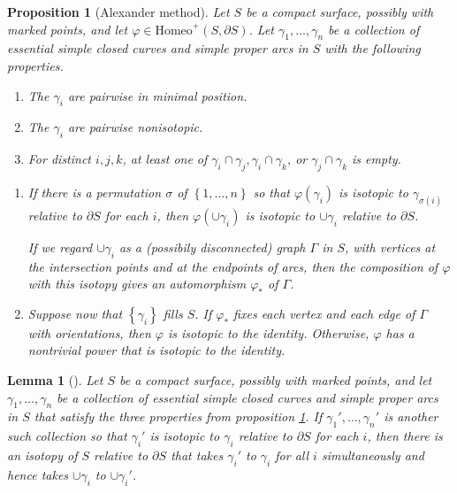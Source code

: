 \documentclass[reqno]{amsart}
\newtheorem{lemma}[theorem]{Lemma}
\newtheorem{proposition}[theorem]{Proposition}
\theoremstyle{definition}
\theoremstyle{remark}
\newcommand{\Homeo}{{\mathrm{Homeo}}}
\begin{document}
\begin{proposition}[Alexander method]\label{Alexander-method}
    \cite[Proposition 2.8]{Farb-Margalit}
    Let $S$ be a compact surface, possibly with marked points,
    and let $\varphi \in \Homeo^{+}\left( S, \partial S \right) $.
    Let $\gamma_1, \ldots, \gamma_n$ be a collection of essential
    simple closed curves and simple proper arcs in $S$ with
    the following properties.
    \begin{enumerate}
        \item The $\gamma_i$ are pairwise in minimal position.
        \item The $\gamma_i$ are pairwise nonisotopic.
        \item For distinct $i,j,k$, at least one of
            $\gamma_i \cap \gamma_j, \gamma_i\cap \gamma_k$,
            or $\gamma_j \cap \gamma_k$ is empty.
    \end{enumerate}
    \begin{enumerate}[label=(\roman*)]
        \item If there is a permutation $\sigma$ of $
            \left\{ 1, \ldots, n \right\} $ so that
            $\varphi \left( \gamma_i \right) $ is isotopic
            to $\gamma_{\sigma (i)}$ relative to
            $\partial S$ for each $i$, then
            $\varphi \left( \cup \gamma_i \right) $ is
            isotopic to $\cup \gamma_i$ relative to
            $\partial S$.

            If we regard $\cup \gamma_i$ as a (possibily disconnected)
            graph $\Gamma $ in $S$, with vertices at the
            intersection points and at the endpoints of arcs, then
            the composition of $\varphi $ with this isotopy
            gives an automorphism $\varphi_* $ of $\Gamma$.

        \item Suppose now that $\left\{ \gamma_i \right\} $ fills
            $S$. If $\varphi_*$ fixes each vertex and each
            edge of $\Gamma$ with orientations, then
            $\varphi $ is isotopic to the identity. Otherwise,
            $\varphi $ has a nontrivial power that is
            isotopic to the identity.
    \end{enumerate}
\end{proposition}

\begin{lemma}[]
    Let $S$ be a compact surface, possibly with marked points,
    and let $\gamma_1, \ldots, \gamma_n$ be a collection of
    essential simple closed curves and simple proper arcs
    in $S$ that satisfy the three properties from 
    proposition \ref{Alexander-method}. If
    $\gamma_1', \ldots, \gamma_n'$ is another such collection
    so that $\gamma_i'$ is isotopic to $\gamma_i$ relative
    to $\partial S$ for each $i$, then there is an
    isotopy of $S$ relative to $\partial S$ that takes
    $\gamma_i'$ to $\gamma_i$ for all $i$ simultaneously and
    hence takes $\cup \gamma_i$ to $\cup \gamma_i'$.
\end{lemma}
\end{document}

